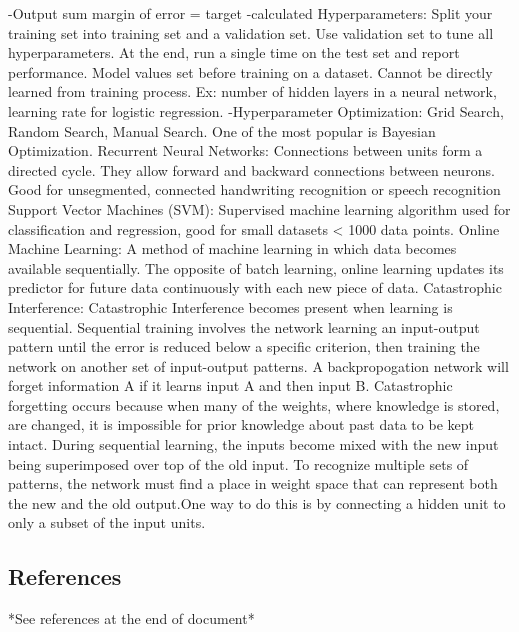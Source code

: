 \documentclass[draftclsnofoot, onecolumn, 10pt, compsoc]{IEEEtran}
\begin{document}
		-Output sum margin of error = target -calculated
\newline \newline
Hyperparameters: Split your training set into training set and a validation set. Use validation set to tune all hyperparameters. At the end, run a single time on the test set and report performance. Model values set before training on a dataset. Cannot be directly learned from training process. Ex: number of hidden layers in a neural network, learning rate for logistic regression.
-Hyperparameter Optimization: Grid Search, Random Search, Manual Search. One of the most popular is Bayesian Optimization.
\newline \newline
Recurrent Neural Networks: Connections between units form a directed cycle. They allow forward and backward connections between neurons. Good for unsegmented, connected handwriting recognition or speech recognition
\newline \newline
Support Vector Machines (SVM): Supervised machine learning algorithm used for classification and regression, good for small datasets < 1000 data points.
\newline \newline
Online Machine Learning: A method of machine learning in which data becomes available sequentially. The opposite of batch learning, online learning updates its predictor for future data continuously with each new piece of data.
\newline \newline	
Catastrophic Interference: Catastrophic Interference becomes present when learning is sequential. Sequential training involves the network learning an input-output pattern until the error is reduced below a specific criterion, then training the network on another set of input-output patterns. A backpropogation network will forget information A if it learns input A and then input B. Catastrophic forgetting occurs because when many of the weights, where knowledge is stored, are changed, it is impossible for prior knowledge about past data to be kept intact. During sequential learning, the inputs become mixed with the new input being superimposed over top of the old input. To recognize multiple sets of patterns, the network must find a place in weight space that can represent both the new and the old output.One way to do this is by connecting a hidden unit to only a subset of the input units. \cite{ImgRecog}
\cite{miller}
\subsection{References}
*See references at the end of document*
\end{document}
